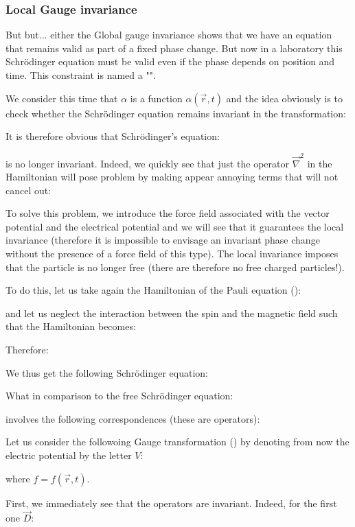	\pagebreak
	\subsubsection{Local Gauge invariance}
	But but... either the Global gauge invariance shows that we have an equation that remains valid as part of a fixed phase change. But now in a laboratory this Schrödinger equation must be valid even if the phase depends on position and time. This constraint is named a "".

	We consider this time that $\alpha$ is a function $\alpha(\vec{r},t)$ and the idea obviously is to check whether the Schrödinger equation remains invariant in the transformation:
	
	It is therefore obvious that Schrödinger's equation:
	
	is no longer invariant. Indeed, we quickly see that just the operator $\vec{\nabla}^2$ in the Hamiltonian will pose problem by making appear annoying terms that will not cancel out:
	
	To solve this problem, we introduce the force field associated with the vector potential and the electrical potential and we will see that it guarantees the local invariance (therefore it is impossible to envisage an invariant phase change without the presence of a force field of this type). The local invariance imposes that the particle is no longer free (there are therefore no free charged particles!).

	To do this, let us take again the Hamiltonian of the Pauli equation ():
	
	and let us neglect the interaction between the spin and the magnetic field such that the Hamiltonian becomes:
	
	Therefore:
	
	We thus get the following Schrödinger equation:
	
	What in comparison to the free Schrödinger equation:
	
	involves the following correspondences (these are operators):
	
	Let us consider the followoing Gauge transformation () by denoting from now the electric potential by the letter $V$:
	
	where $f=f(\vec{r},t)$.
	
	First, we immediately see that the operators are invariant. Indeed, for the first one $\vec{D}$:
	
